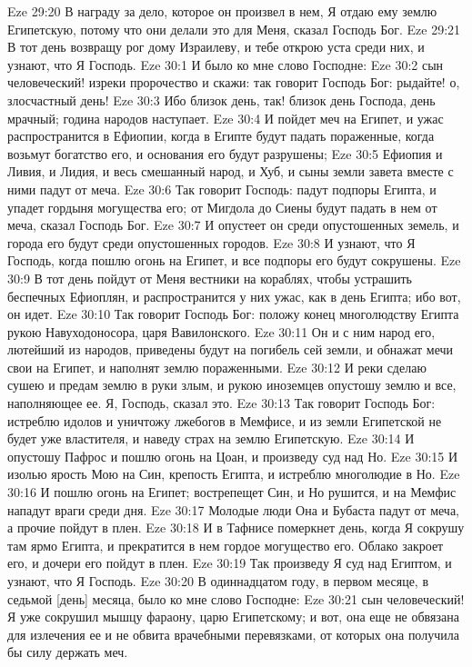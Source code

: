 Eze 29:20  В награду за дело, которое он произвел в нем, Я отдаю ему землю Египетскую, потому что они делали это для Меня, сказал Господь Бог.
Eze 29:21  В тот день возвращу рог дому Израилеву, и тебе открою уста среди них, и узнают, что Я Господь.
Eze 30:1  И было ко мне слово Господне:
Eze 30:2  сын человеческий! изреки пророчество и скажи: так говорит Господь Бог: рыдайте! о, злосчастный день!
Eze 30:3  Ибо близок день, так! близок день Господа, день мрачный; година народов наступает.
Eze 30:4  И пойдет меч на Египет, и ужас распространится в Ефиопии, когда в Египте будут падать пораженные, когда возьмут богатство его, и основания его будут разрушены;
Eze 30:5  Ефиопия и Ливия, и Лидия, и весь смешанный народ, и Хуб, и сыны земли завета вместе с ними падут от меча.
Eze 30:6  Так говорит Господь: падут подпоры Египта, и упадет гордыня могущества его; от Мигдола до Сиены будут падать в нем от меча, сказал Господь Бог.
Eze 30:7  И опустеет он среди опустошенных земель, и города его будут среди опустошенных городов.
Eze 30:8  И узнают, что Я Господь, когда пошлю огонь на Египет, и все подпоры его будут сокрушены.
Eze 30:9  В тот день пойдут от Меня вестники на кораблях, чтобы устрашить беспечных Ефиоплян, и распространится у них ужас, как в день Египта; ибо вот, он идет.
Eze 30:10  Так говорит Господь Бог: положу конец многолюдству Египта рукою Навуходоносора, царя Вавилонского.
Eze 30:11  Он и с ним народ его, лютейший из народов, приведены будут на погибель сей земли, и обнажат мечи свои на Египет, и наполнят землю пораженными.
Eze 30:12  И реки сделаю сушею и предам землю в руки злым, и рукою иноземцев опустошу землю и все, наполняющее ее. Я, Господь, сказал это.
Eze 30:13  Так говорит Господь Бог: истреблю идолов и уничтожу лжебогов в Мемфисе, и из земли Египетской не будет уже властителя, и наведу страх на землю Египетскую.
Eze 30:14  И опустошу Пафрос и пошлю огонь на Цоан, и произведу суд над Но.
Eze 30:15  И изолью ярость Мою на Син, крепость Египта, и истреблю многолюдие в Но.
Eze 30:16  И пошлю огонь на Египет; вострепещет Син, и Но рушится, и на Мемфис нападут враги среди дня.
Eze 30:17  Молодые люди Она и Бубаста падут от меча, а прочие пойдут в плен.
Eze 30:18  И в Тафнисе померкнет день, когда Я сокрушу там ярмо Египта, и прекратится в нем гордое могущество его. Облако закроет его, и дочери его пойдут в плен.
Eze 30:19  Так произведу Я суд над Египтом, и узнают, что Я Господь.
Eze 30:20  В одиннадцатом году, в первом месяце, в седьмой [день] месяца, было ко мне слово Господне:
Eze 30:21  сын человеческий! Я уже сокрушил мышцу фараону, царю Египетскому; и вот, она еще не обвязана для излечения ее и не обвита врачебными перевязками, от которых она получила бы силу держать меч.

